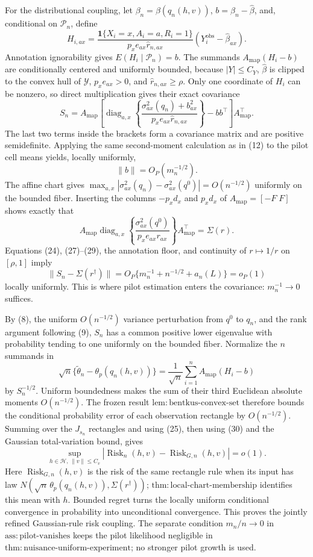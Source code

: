 For the distributional coupling, let \(\beta_n=\beta(q_n(h,v))\), \(b=\beta_n-\widehat\beta\), and, conditional on \(\mathscr P_n\), define
\[
H_{i,ax}=\frac{\mathbf1\{X_i=x,A_i=a,R_i=1\}}
{p_xe_{ax}\widehat r_{n,ax}}
(Y_i^{\mathrm{obs}}-\widehat\beta_{ax}).
\tag{26}
\]
Annotation ignorability gives \(E(H_i\mid\mathscr P_n)=b\). The summands \(A_{\mathrm{map}}(H_i-b)\) are conditionally centered and uniformly bounded, because \(|Y|\le C_Y\), \(\widehat\beta\) is clipped to the convex hull of \(\mathcal Y\), \(p_xe_{ax}>0\), and \(\widehat r_{n,ax}\ge\rho\). Only one coordinate of \(H_i\) can be nonzero, so direct multiplication gives their exact covariance
\[
S_n=A_{\mathrm{map}}\left[
\operatorname{diag}_{a,x}\left\{
\frac{\sigma^2_{ax}(q_n)+b_{ax}^2}
{p_xe_{ax}\widehat r_{n,ax}}
\right\}-bb^\top\right]A_{\mathrm{map}}^\top.
\tag{27}
\]
The last two terms inside the brackets form a covariance matrix and are positive semidefinite. Applying the same second-moment calculation as in (12) to the pilot cell means yields, locally uniformly,
\[
\lVert b\rVert=O_P(m_n^{-1/2}).
\tag{28}
\]
The affine chart gives \(\max_{a,x}|\sigma^2_{ax}(q_n)-\sigma^2_{ax}(q^0)|=O(n^{-1/2})\) uniformly on the bounded fiber. Inserting the columns \(-p_xd_x\) and \(p_xd_x\) of \(A_{\mathrm{map}}=[-F\;F]\) shows exactly that
\[
A_{\mathrm{map}}\operatorname{diag}_{a,x}\left\{
\frac{\sigma^2_{ax}(q^0)}{p_xe_{ax}r_{ax}}
\right\}A_{\mathrm{map}}^\top=\Sigma(r).
\tag{29}
\]
Equations (24), (27)--(29), the annotation floor, and continuity of \(r\mapsto1/r\) on \([\rho,1]\) imply
\[
\lVert S_n-\Sigma(r^\dagger)\rVert
=O_P\{m_n^{-1}+n^{-1/2}+a_n(L)\}=o_P(1)
\tag{30}
\]
locally uniformly. This is where pilot estimation enters the covariance: \(m_n^{-1}\to0\) suffices.

By (8), the uniform \(O(n^{-1/2})\) variance perturbation from \(q^0\) to \(q_n\), and the rank argument following (9), \(S_n\) has a common positive lower eigenvalue with probability tending to one uniformly on the bounded fiber. Normalize the \(n\) summands in
\[
\sqrt n\{\widetilde\theta_n-\theta_p(q_n(h,v))\}
=\frac1{\sqrt n}\sum_{i=1}^nA_{\mathrm{map}}(H_i-b)
\tag{31}
\]
by \(S_n^{-1/2}\). Uniform boundedness makes the sum of their third Euclidean absolute moments \(O(n^{-1/2})\). The frozen result \(\mathrm{lem:bentkus\text{-}convex\text{-}set}\) therefore bounds the conditional probability error of each observation rectangle by \(O(n^{-1/2})\). Summing over the \(J_{s_n}\) rectangles and using (25), then using (30) and the Gaussian total-variation bound, gives
\[
\sup_{h\in\mathcal H,\,\lVert v\rVert\le C_v}
|\operatorname{Risk}_n(h,v)-\operatorname{Risk}_{G,n}(h,v)|=o(1).
\tag{32}
\]
Here \(\operatorname{Risk}_{G,n}(h,v)\) is the risk of the same rectangle rule when its input has law \(N(\sqrt n\,\theta_p(q_n(h,v)),\Sigma(r^\dagger))\); \(\mathrm{thm:local\text{-}chart\text{-}membership}\) identifies this mean with \(h\). Bounded regret turns the locally uniform conditional convergence in probability into unconditional convergence. This proves the jointly refined Gaussian-rule risk coupling. The separate condition \(m_n/n\to0\) in \(\mathrm{ass:pilot\text{-}vanishes}\) keeps the pilot likelihood negligible in \(\mathrm{thm:nuisance\text{-}uniform\text{-}experiment}\); no stronger pilot growth is used.


